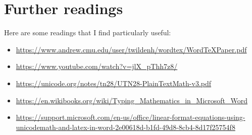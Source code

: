 \documentclass[12pt]{article}
\theoremstyle{plain}
\theoremstyle{remark}
\theoremstyle{definition}
\begin{document}
\medskip
\printbibliography[heading=bibnumbered]

\section{Further readings}

Here are some readings that I find particularly useful:

\begin{itemize}
\item
  \url{https://www.andrew.cmu.edu/user/twildenh/wordtex/WordTeXPaper.pdf}
\item
  \url{https://www.youtube.com/watch?v=jlX_pThh7z8/}
\item
  \url{https://unicode.org/notes/tn28/UTN28-PlainTextMath-v3.pdf}
\item
  \url{https://en.wikibooks.org/wiki/Typing_Mathematics_in_Microsoft_Word}
\item
  \url{https://support.microsoft.com/en-us/office/linear-format-equations-using-unicodemath-and-latex-in-word-2e00618d-b1fd-49d8-8cb4-8d17f25754f8}
\end{itemize}
\end{document}
